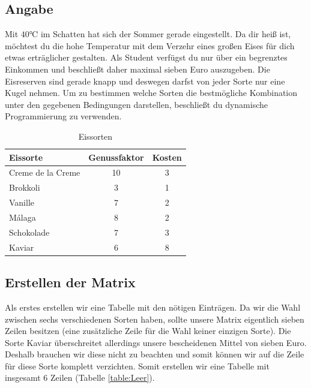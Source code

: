 \documentclass[a4paper, 12pt]{article}
\begin{document}
\subsection{Angabe}

Mit $40℃$ im Schatten hat sich der Sommer gerade eingestellt. Da dir
heiß ist, möchtest du die hohe Temperatur mit dem Verzehr eines großen Eises
für dich etwas erträglicher gestalten. Als Student verfügst du nur über ein
begrenztes Einkommen und beschließt daher maximal sieben Euro auszugeben. Die
Eisreserven sind gerade knapp und deswegen darfst von jeder Sorte nur eine
Kugel nehmen. Um zu bestimmen welche Sorten die bestmögliche Kombination unter
den gegebenen Bedingungen darstellen, beschließt du dynamische Programmierung
zu verwenden.

\begin{table}[H]
	\begin{center}
		\begin{tabular}{lcc}
			Eissorte & Genussfaktor & Kosten\\
			\hline
			Creme de la Creme	& 10	& 3\\
			Brokkoli			& 3		& 1\\
			Vanille				& 7		& 2\\
			Málaga				& 8		& 2\\
			Schokolade			& 7		& 3\\
			Kaviar				& 6		& 8\\
		\end{tabular}
	\end{center}
\caption{Eissorten}
\label{table:Label}
\end{table}

\subsection{Erstellen der Matrix}

Als erstes erstellen wir eine Tabelle mit den nötigen Einträgen. Da wir die
Wahl zwischen sechs verschiedenen Sorten haben, sollte unsere Matrix
eigentlich sieben Zeilen besitzen (eine zusätzliche Zeile für die Wahl keiner
einzigen Sorte). Die Sorte Kaviar überschreitet allerdings unsere bescheidenen
Mittel von sieben Euro. Deshalb brauchen wir diese nicht zu beachten und somit
können wir auf die Zeile für diese Sorte komplett verzichten. Somit erstellen
wir eine Tabelle mit insgesamt 6 Zeilen (Tabelle \ref{table:Leer}).
\end{document}

